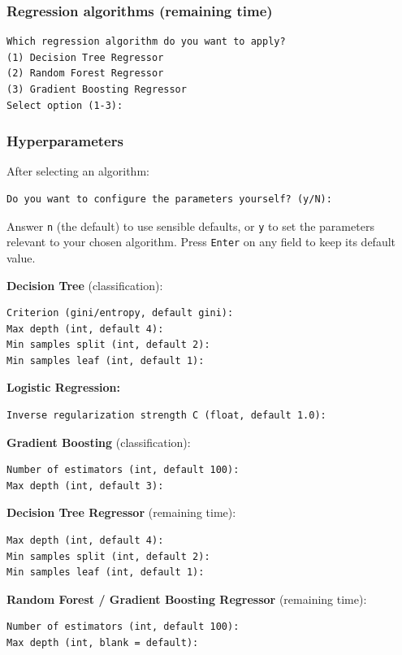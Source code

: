 \documentclass[12pt,a4paper]{article}
\begin{document}
\subsubsection{Regression algorithms (remaining time)}
\begin{verbatim}
Which regression algorithm do you want to apply?
(1) Decision Tree Regressor
(2) Random Forest Regressor
(3) Gradient Boosting Regressor
Select option (1-3):
\end{verbatim}

\subsubsection{Hyperparameters}
After selecting an algorithm:
\begin{verbatim}
Do you want to configure the parameters yourself? (y/N):
\end{verbatim}
Answer \texttt{n} (the default) to use sensible defaults, or \texttt{y} to set the parameters relevant to your chosen algorithm. Press \texttt{Enter} on any field to keep its default value.

\textbf{Decision Tree} (classification):
\begin{verbatim}
Criterion (gini/entropy, default gini):
Max depth (int, default 4):
Min samples split (int, default 2):
Min samples leaf (int, default 1):
\end{verbatim}

\textbf{Logistic Regression:}
\begin{verbatim}
Inverse regularization strength C (float, default 1.0):
\end{verbatim}

\textbf{Gradient Boosting} (classification):
\begin{verbatim}
Number of estimators (int, default 100):
Max depth (int, default 3):
\end{verbatim}

\textbf{Decision Tree Regressor} (remaining time):
\begin{verbatim}
Max depth (int, default 4):
Min samples split (int, default 2):
Min samples leaf (int, default 1):
\end{verbatim}

\textbf{Random Forest / Gradient Boosting Regressor} (remaining time):
\begin{verbatim}
Number of estimators (int, default 100):
Max depth (int, blank = default):
\end{verbatim}

\end{document}
